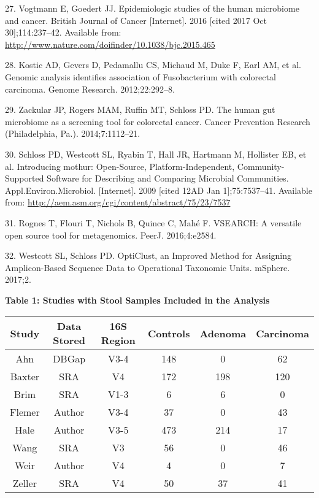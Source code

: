 \documentclass[12pt,]{article}
\begin{document}
\hypertarget{ref-vogtmann_epidemiologic_2016}{}
27. Vogtmann E, Goedert JJ. Epidemiologic studies of the human
microbiome and cancer. British Journal of Cancer {[}Internet{]}. 2016
{[}cited 2017 Oct 30{]};114:237--42. Available from:
\url{http://www.nature.com/doifinder/10.1038/bjc.2015.465}

\hypertarget{ref-kostic_genomic_2012}{}
28. Kostic AD, Gevers D, Pedamallu CS, Michaud M, Duke F, Earl AM, et
al. Genomic analysis identifies association of Fusobacterium with
colorectal carcinoma. Genome Research. 2012;22:292--8.

\hypertarget{ref-zackular_human_2014}{}
29. Zackular JP, Rogers MAM, Ruffin MT, Schloss PD. The human gut
microbiome as a screening tool for colorectal cancer. Cancer Prevention
Research (Philadelphia, Pa.). 2014;7:1112--21.

\hypertarget{ref-schloss_introducing_2009}{}
30. Schloss PD, Westcott SL, Ryabin T, Hall JR, Hartmann M, Hollister
EB, et al. Introducing mothur: Open-Source, Platform-Independent,
Community-Supported Software for Describing and Comparing Microbial
Communities. Appl.Environ.Microbiol. {[}Internet{]}. 2009 {[}cited 12AD
Jan 1{]};75:7537--41. Available from:
\url{http://aem.asm.org/cgi/content/abstract/75/23/7537}

\hypertarget{ref-rognes_vsearch_2016}{}
31. Rognes T, Flouri T, Nichols B, Quince C, Mahé F. VSEARCH: A
versatile open source tool for metagenomics. PeerJ. 2016;4:e2584.

\hypertarget{ref-westcott_opticlust_2017}{}
32. Westcott SL, Schloss PD. OptiClust, an Improved Method for Assigning
Amplicon-Based Sequence Data to Operational Taxonomic Units. mSphere.
2017;2.

\newpage

\textbf{Table 1: Studies with Stool Samples Included in the Analysis}

\footnotesize

\begin{longtable}[]{@{}cccccc@{}}
\toprule
Study & Data Stored & 16S Region & Controls & Adenoma &
Carcinoma\tabularnewline
\midrule
\endhead
Ahn & DBGap & V3-4 & 148 & 0 & 62\tabularnewline
Baxter & SRA & V4 & 172 & 198 & 120\tabularnewline
Brim & SRA & V1-3 & 6 & 6 & 0\tabularnewline
Flemer & Author & V3-4 & 37 & 0 & 43\tabularnewline
Hale & Author & V3-5 & 473 & 214 & 17\tabularnewline
Wang & SRA & V3 & 56 & 0 & 46\tabularnewline
Weir & Author & V4 & 4 & 0 & 7\tabularnewline
Zeller & SRA & V4 & 50 & 37 & 41\tabularnewline
\bottomrule
\end{longtable}
\end{document}
